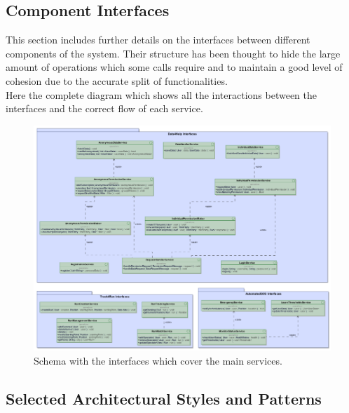 \documentclass[a4paper]{article}
\begin{document}
\subsection{Component Interfaces}
This section includes further details on the interfaces between different components of the system. Their structure has been thought to hide the large amount of operations which some calls require and to maintain a good level of cohesion due to the accurate split of functionalities.\\
Here the complete diagram which shows all the interactions between the interfaces and the correct flow of each service.

\begin{figure}[H]
    \centering
    \includegraphics[width=\linewidth]{ComponentInterfaces}
    \caption{Schema with the interfaces which cover the main services.}
    \label{fig:my_label}
\end{figure}
\clearpage

\subsection{Selected Architectural Styles and Patterns}
\end{document}
